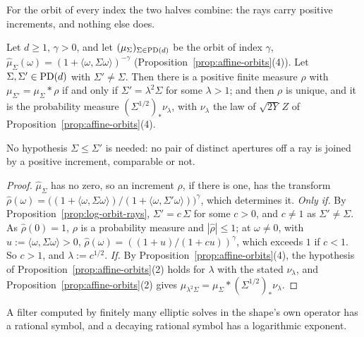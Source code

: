 For the \Matern{} orbit of every index the two halves combine: the rays carry positive increments,
and nothing else does.

\begin{proposition}\label{prop:matern-steps}
Let $d \ge 1$, $\gamma > 0$, and let $(\mu_\Sigma)_{\Sigma\in\mathrm{PD}(d)}$ be the \Matern{} orbit of index
$\gamma$, $\widehat\mu_\Sigma(\omega) = (1 + \langle\omega,\Sigma\omega\rangle)^{-\gamma}$
(Proposition~\ref{prop:affine-orbits}(4)). Let $\Sigma, \Sigma' \in \mathrm{PD}(d)$ with $\Sigma' \ne \Sigma$. Then there
is a positive finite measure $\rho$ with $\mu_{\Sigma'} = \mu_\Sigma * \rho$ if and only if
$\Sigma' = \lambda^2\Sigma$ for some $\lambda > 1$; and then $\rho$ is unique, and it is the
probability measure $(\Sigma^{1/2})_*\nu_\lambda$, with $\nu_\lambda$ the law of $\sqrt{2Y}\,Z$ of
Proposition~\ref{prop:affine-orbits}(4).
\end{proposition}

No hypothesis $\Sigma \le \Sigma'$ is needed: no pair of distinct apertures off a ray is joined by a
positive increment, comparable or not.

\begin{proof}
$\widehat\mu_\Sigma$ has no zero, so an increment $\rho$, if there is one, has the transform
$\widehat\rho(\omega) = \bigl((1 + \langle\omega,\Sigma\omega\rangle)/(1 + \langle\omega,\Sigma'\omega\rangle)\bigr)^\gamma$,
which determines it. \emph{Only if.} By Proposition~\ref{prop:log-orbit-rays}, $\Sigma' = c\,\Sigma$ for
some $c > 0$, and $c \ne 1$ as $\Sigma' \ne \Sigma$. As $\widehat\rho(0) = 1$, $\rho$ is a probability
measure and $|\widehat\rho| \le 1$; at $\omega \ne 0$, with $u := \langle\omega,\Sigma\omega\rangle > 0$,
$\widehat\rho(\omega) = ((1+u)/(1+cu))^\gamma$, which exceeds $1$ if $c < 1$. So $c > 1$, and
$\lambda := c^{1/2}$. \emph{If.} By Proposition~\ref{prop:affine-orbits}(4), the hypothesis of
Proposition~\ref{prop:affine-orbits}(2) holds for $\lambda$ with the stated $\nu_\lambda$, and
Proposition~\ref{prop:affine-orbits}(2) gives $\mu_{\lambda^2\Sigma} = \mu_\Sigma * (\Sigma^{1/2})_*\nu_\lambda$.
\end{proof}

A filter computed by finitely many elliptic solves in the shape's own operator has a rational symbol,
and a decaying rational symbol has a logarithmic exponent.

